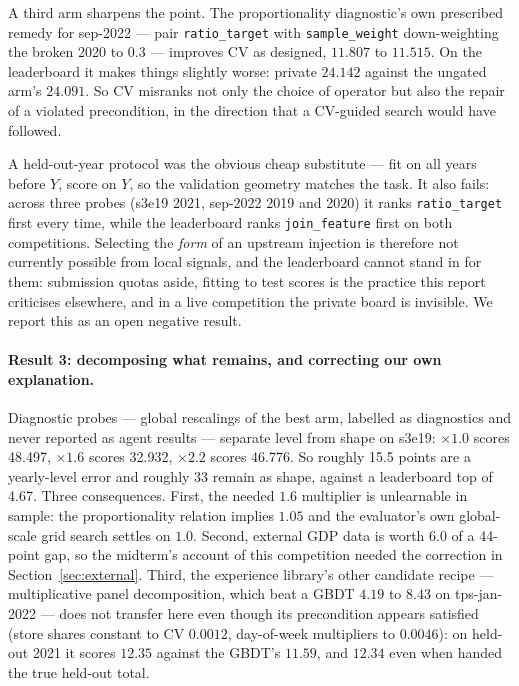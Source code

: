 \documentclass[11pt,a4paper]{article}
\begin{document}
A third arm sharpens the point. The proportionality diagnostic's own prescribed remedy for sep-2022 --- pair \texttt{ratio\_target} with \texttt{sample\_weight} down-weighting the broken 2020 to $0.3$ --- improves CV as designed, $11.807$ to $11.515$. On the leaderboard it makes things slightly worse: private $24.142$ against the ungated arm's $24.091$. So CV misranks not only the choice of operator but also the repair of a violated precondition, in the direction that a CV-guided search would have followed.

A held-out-year protocol was the obvious cheap substitute --- fit on all years before $Y$, score on $Y$, so the validation geometry matches the task. It also fails: across three probes (s3e19 2021, sep-2022 2019 and 2020) it ranks \texttt{ratio\_target} first every time, while the leaderboard ranks \texttt{join\_feature} first on both competitions. Selecting the \emph{form} of an upstream injection is therefore not currently possible from local signals, and the leaderboard cannot stand in for them: submission quotas aside, fitting to test scores is the practice this report criticises elsewhere, and in a live competition the private board is invisible. We report this as an open negative result.

\paragraph{Result 3: decomposing what remains, and correcting our own explanation.} Diagnostic probes --- global rescalings of the best arm, labelled as diagnostics and never reported as agent results --- separate level from shape on s3e19: $\times 1.0$ scores 48.497, $\times 1.6$ scores 32.932, $\times 2.2$ scores 46.776. So roughly 15.5 points are a yearly-level error and roughly 33 remain as shape, against a leaderboard top of 4.67. Three consequences. First, the needed $1.6$ multiplier is unlearnable in sample: the proportionality relation implies $1.05$ and the evaluator's own global-scale grid search settles on $1.0$. Second, external GDP data is worth $6.0$ of a 44-point gap, so the midterm's account of this competition needed the correction in Section~\ref{sec:external}. Third, the experience library's other candidate recipe --- multiplicative panel decomposition, which beat a GBDT $4.19$ to $8.43$ on tps-jan-2022 --- does not transfer here even though its precondition appears satisfied (store shares constant to CV $0.0012$, day-of-week multipliers to $0.0046$): on held-out 2021 it scores $12.35$ against the GBDT's $11.59$, and $12.34$ even when handed the true held-out total.
\end{document}
